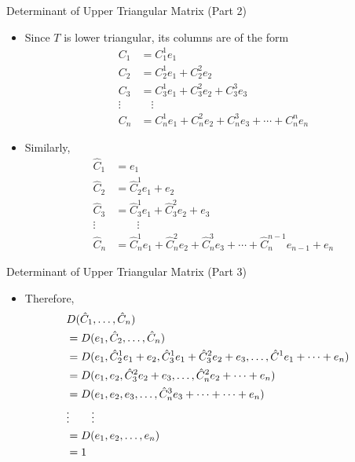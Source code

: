 \documentclass[usenames,dvipsnames,10pt]{beamer}
\begin{document}
\begin{frame}
  {Determinant of Upper Triangular Matrix (Part 2)}

  \begin{itemize}
  \item Since $T$ is lower triangular, its columns are of the form
    \begin{align*}
      C_1 &= C^1_1e_1\\
      C_2 &= C^1_2e_1 + C^2_2e_2\\
      C_3 &= C^1_3e_1 + C^2_3e_2 + C^3_3e_3\\
      \vdots &\quad \vdots\\
      C_n &= C^1_ne_1 + C^2_ne_2 + C^3_ne_3 + \cdots + C^n_ne_n
    \end{align*}
  \item Similarly,
    \begin{align*}
      \hat{C}_1 &= e_1\\
      \hat{C}_2 &= \hat{C}^1_2e_1 + e_2\\
      \hat{C}_3 &= \hat{C}^1_3e_1 + \hat{C}^2_3e_2 + e_3\\
      \vdots &\quad\quad \vdots\\
      \hat{C}_n &= \hat{C}^1_ne_1 + \hat{C}^2_ne_2 + \hat{C}^3_ne_3 + \cdots + \hat{C}^{n-1}_n e_{n-1} + e_n
    \end{align*}
  \end{itemize}
\end{frame}

\begin{frame}
  {Determinant of Upper Triangular Matrix (Part 3)}

  \begin{itemize}
  \item Therefore,
    \begin{align*}
      \lefteqn{D(\hat{C}_1, \dots, \hat{C}_n)}\\
      &= D(e_1, \hat{C}_2, \dots, \hat{C}_n)\\
      &= D(e_1, \hat{C}^1_2e_1 + e_2, \hat{C}^1_3e_1+\hat{C}^2_3e_2+e_3, \dots, \hat{C}^1e_1 + \cdots + e_n)\\
      &= D(e_1, e_2, \hat{C}^2_3e_2 + e_3, \dots, \hat{C}^2_ne_2 +\cdots+ e_n)\\
      &= D(e_1, e_2, e_3, \dots, \hat{C}^3_ne_3 + \cdots + \cdots + e_n)\\
      &\vdots\quad\quad\vdots\\
      &= D(e_1, e_2, \dots, e_n)\\
      &= 1
    \end{align*}
  \end{itemize}
\end{frame}
\end{document}
